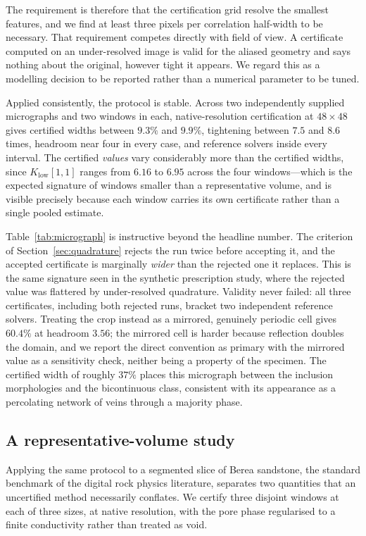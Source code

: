 The requirement is therefore that the certification grid resolve the
smallest features, and we find at least three pixels per correlation
half-width to be necessary. That requirement competes directly with
field of view. A certificate computed on an under-resolved image is valid
for the aliased geometry and says nothing about the original, however tight
it appears. We regard this as a modelling decision to be reported rather
than a numerical parameter to be tuned.

Applied consistently, the protocol is stable. Across two independently
supplied micrographs and two windows in each, native-resolution
certification at $48\times48$ gives certified widths between $9.3\%$ and
$9.9\%$, tightening between $7.5$ and $8.6$ times, headroom near four in
every case, and reference solvers inside every interval. The certified
\emph{values} vary considerably more than the certified widths, since $K_{\mathrm{low}}[1,1]$ ranges from $6.16$ to $6.95$ across the four
windows---which is the expected signature of windows smaller than a
representative volume, and is visible precisely because each window carries
its own certificate rather than a single pooled estimate.

Table~\ref{tab:micrograph} is instructive beyond the headline number. The
criterion of Section~\ref{sec:quadrature} rejects the run twice before
accepting it, and the accepted certificate is marginally \emph{wider} than
the rejected one it replaces. This is the same signature seen in the synthetic
prescription study, where the rejected value was flattered by
under-resolved quadrature. Validity never failed: all three certificates,
including both rejected runs, bracket two independent reference solvers.
Treating the crop instead as a mirrored, genuinely periodic cell gives
$60.4\%$ at headroom $3.56$; the mirrored cell is harder because reflection
doubles the domain, and we report the direct convention as primary with the
mirrored value as a sensitivity check, neither being a property of the
specimen. The certified width of roughly $37\%$ places this micrograph
between the inclusion morphologies and the bicontinuous class, consistent
with its appearance as a percolating network of veins through a majority
phase.

\subsection{A representative-volume study}
\label{sec:limits:rve}

Applying the same protocol to a segmented slice of Berea sandstone, the
standard benchmark of the digital rock physics literature, separates two
quantities that an uncertified method necessarily conflates. We certify
three disjoint windows at each of three sizes, at native resolution, with
the pore phase regularised to a finite conductivity rather than treated as
void.

